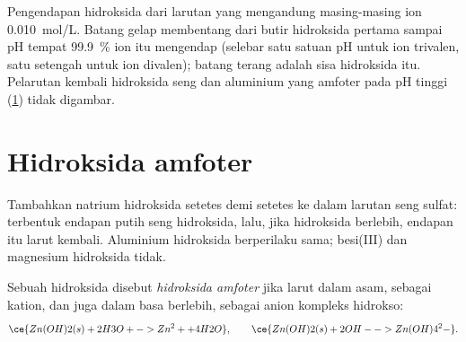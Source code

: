 \begin{omfigure}

{\small Pengendapan hidroksida dari larutan yang mengandung masing-masing
ion \qty{0.010}{mol/L}. Batang gelap membentang dari butir hidroksida
pertama sampai pH tempat \qty{99.9}{\percent} ion itu mengendap (selebar
satu satuan pH untuk ion trivalen, satu setengah untuk ion divalen);
batang terang adalah sisa  hidroksida itu. Pelarutan
kembali hidroksida seng dan aluminium yang amfoter pada pH tinggi
(\cref{sec:b1:precipitation:amphoteric}) tidak digambar.}
\end{omfigure}

\section{Hidroksida amfoter}\label{sec:b1:precipitation:amphoteric}

Tambahkan natrium hidroksida setetes demi setetes ke dalam larutan seng
sulfat: terbentuk endapan putih seng hidroksida, lalu, jika hidroksida
berlebih, endapan itu larut kembali. Aluminium hidroksida berperilaku
sama; besi(III) dan magnesium hidroksida tidak.

\begin{definition}\label{def:b1:precipitation:amphoteric-hydroxide}
Sebuah hidroksida disebut \emph{hidroksida amfoter}
jika larut dalam asam, sebagai kation, dan juga dalam basa berlebih,
sebagai anion kompleks hidrokso:
\[
  \ce{Zn(OH)2(s) + 2H3O+ -> Zn^2+ + 4H2O}, \qquad
  \ce{Zn(OH)2(s) + 2OH- -> Zn(OH)4^2-} .
\]
\end{definition}

